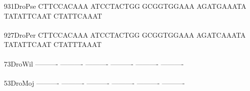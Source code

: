 \documentclass[11pt,twoside,reqno,a4paper]{article}
\begin{document}
{931\hspace*{2\charwidth}DroPse	CTTCCACAAA	ATCCTACTGG	GCGGTGGAAA	AGATGAAATA	TATATTCAAT	CTATTCAAAT	\\
\hspace*{5\charwidth}\hspace*{7\charwidth}\hspace*{1\charwidth}\hspace*{1\charwidth}\hspace*{1\charwidth}\hspace*{1\charwidth}\hspace*{1\charwidth}\hspace*{1\charwidth}\\
927\hspace*{2\charwidth}DroPer	CTTCCACAAA	ATCCTACTGG	GCGGTGGAAA	AGATCAAATA	TATATTCAAT	CTATTTAAAT	\\
\hspace*{5\charwidth}\hspace*{7\charwidth}\hspace*{1\charwidth}\hspace*{1\charwidth}\hspace*{1\charwidth}\hspace*{1\charwidth}\hspace*{1\charwidth}\hspace*{1\charwidth}\\
73\hspace*{3\charwidth}DroWil	----------	----------	----------	----------	----------	----------	\\
\hspace*{5\charwidth}\hspace*{7\charwidth}\hspace*{1\charwidth}\hspace*{1\charwidth}\hspace*{1\charwidth}\hspace*{1\charwidth}\hspace*{1\charwidth}\hspace*{1\charwidth}\\
53\hspace*{3\charwidth}DroMoj	----------	----------	----------	----------	----------	----------	\\
\hspace*{5\charwidth}\hspace*{7\charwidth}\hspace*{1\charwidth}\hspace*{1\charwidth}\hspace*{1\charwidth}\hspace*{1\charwidth}\hspace*{1\charwidth}\hspace*{1\charwidth}\\
}
\end{document}
